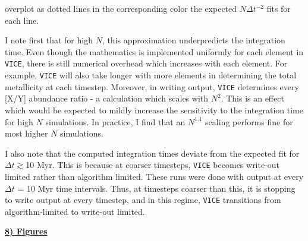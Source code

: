 \documentclass{report}
\begin{document}
overplot as dotted lines in the corresponding color the expected 
$N\Delta t^{-2}$ fits for each line. 
\par
I note first that for high 
$N$, this approximation underpredicts the integration time. Even though the 
mathematics is implemented uniformly for each element in \texttt{VICE}, there 
is still numerical overhead which increases with each element. For example, 
\texttt{VICE} will also take longer with more elements in determining the total 
metallicity at each timestep. Moreover, in writing output, \texttt{VICE} 
determines every [X/Y] abundance ratio - a calculation which scales with 
$N^2$. This is an effect which would be expected to mildly increase the 
sensitivity to the integration time for high $N$ simulations. In practice, I 
find that an $N^{1.1}$ scaling performs fine for most higher $N$ simulations. 
\par
I also note that the computed integration times deviate from the expected fit 
for $\Delta t\gtrsim$10 Myr. This is because at coarser timesteps, \texttt{VICE} 
becomes write-out limited rather than algorithm limited. These runs were done 
with output at every $\Delta t$ = 10 Myr time intervals. Thus, at timesteps 
coarser than this, it is stopping to write output at every timestep, and in 
this regime, \texttt{VICE} transitions from algorithm-limited to write-out 
limited. 






\newpage 
\noindent
\begin{center}
\hypertarget{sec:figures}{
	\underline{\LARGE
		\textbf{8) Figures}
	}
}
\end{center}
\end{document}
